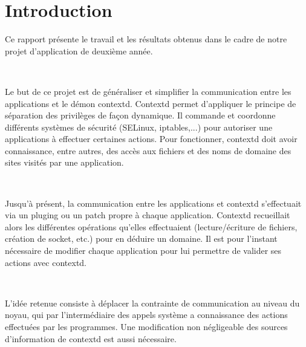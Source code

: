 \section*{Introduction} 
Ce rapport présente le travail et les résultats obtenus dans le cadre de notre projet d'application de deuxième année.

~

Le but de ce projet est de généraliser et simplifier la communication entre les applications et le démon contextd. Contextd permet d'appliquer le principe de séparation des privilèges de façon dynamique. Il commande et coordonne différents systèmes de sécurité (SELinux, iptables,...) pour autoriser une applications à effectuer certaines actions. Pour fonctionner, contextd doit avoir connaissance, entre autres, des accès aux fichiers et des noms de domaine des sites visités par une application.

~

Jusqu'à présent, la communication entre les applications et contextd s'effectuait via un pluging ou un patch propre à chaque application. Contextd recueillait alors les différentes opérations qu'elles effectuaient (lecture/écriture de fichiers, création de socket, etc.) pour en déduire un domaine. Il est pour l'instant nécessaire de modifier chaque application pour lui permettre de valider ses actions avec contextd.

~

L'idée retenue consiste à déplacer la contrainte de communication au niveau du noyau, qui par l'intermédiaire des appels système a connaissance des actions effectuées par les programmes. Une modification non négligeable des sources d'information de contextd est aussi nécessaire.

~

%
%
